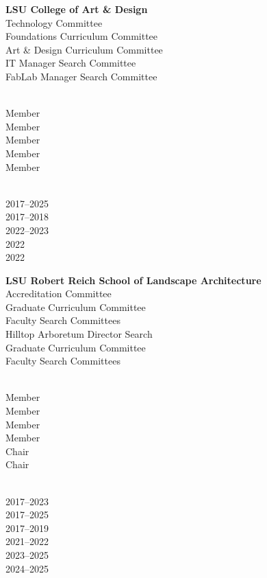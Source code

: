 \documentclass[10pt]{designcv}
\begin{document}
\begin{minipage}[t]{0.7\textwidth}
\textbf{LSU College of Art \& Design}\\
Technology Committee\\
Foundations Curriculum Committee\\
Art \& Design Curriculum Committee\\
IT Manager Search Committee\\
FabLab Manager Search Committee\\
\end{minipage}
\hfill
\begin{minipage}[t]{0.125\textwidth} 
\ \\
Member\\
Member\\
Member\\
Member\\
Member\\
\end{minipage}
\hfill
\begin{minipage}[t]{0.15\textwidth}
\ \\
2017--2025\\
2017--2018\\
2022--2023\\
2022\\
2022\\
\end{minipage}

\begin{minipage}[t]{0.7\textwidth}
\textbf{LSU Robert Reich School of Landscape Architecture}\\ 
Accreditation Committee\\
Graduate Curriculum Committee\\
Faculty Search Committees\\
Hilltop Arboretum Director Search\\
Graduate Curriculum Committee\\
Faculty Search Committees\\
\end{minipage}
\hfill
\begin{minipage}[t]{0.125\textwidth} 
\ \\
Member\\
Member\\
Member\\
Member\\
Chair\\
Chair\\
\end{minipage}
\hfill
\begin{minipage}[t]{0.15\textwidth}
\ \\
2017--2023\\
2017--2025\\
2017--2019\\
2021--2022\\
2023--2025\\
2024--2025\\
\end{minipage}
\hfill
\end{document}
